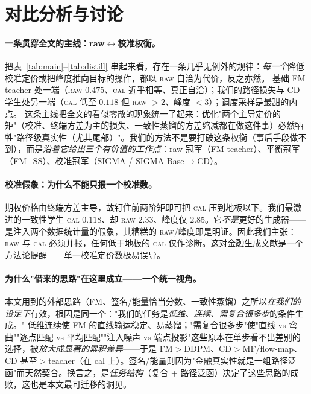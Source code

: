 \documentclass[11pt]{ctexart}
\newcommand{\raw}{\textsc{raw}}
\renewcommand{\cal}{\textsc{cal}}
\begin{document}
\section{对比分析与讨论}
\label{sec:discussion}

\paragraph{一条贯穿全文的主线：raw$\leftrightarrow$校准权衡。}
把表~\ref{tab:main}–\ref{tab:distill} 串起来看，存在一条几乎无例外的规律：\emph{每一个}降低校准定价或把峰度推向目标的操作，都以 \raw{} 自洽为代价，反之亦然。
基础 FM teacher 处一端（\raw{} $0.475$、\cal{} 近乎相等、真正自洽）；我们的路径损失与 CD 学生处另一端（\cal{} 低至 $0.118$ 但 \raw{} $>2$、峰度 $<3$）；调度采样是最甜的内点。
这条主线把全文的看似零散的现象统一了起来：优化"两个主导定价的矩"（校准、终端方差为主的损失、一致性蒸馏的方差缩减都在做这件事）必然牺牲"路径级真实性（尤其尾部）"。我们的方法不是要打破这条权衡（事后手段做不到），而是\emph{沿着它给出三个有价值的工作点}：raw 冠军（FM teacher）、平衡冠军（FM+SS）、校准冠军（SIGMA / SIGMA-Base$\to$CD）。

\paragraph{校准假象：为什么不能只报一个校准数。}
期权价格由终端方差主导，故钉住前两阶矩即可把 \cal{} 压到地板以下。我们最激进的一致性学生 \cal{} $0.118$、却 \raw{} $2.33$、峰度仅 $2.85$。它\emph{不是}更好的生成器——是注入两个数据统计量的假象，其糟糕的 \raw{}/峰度即是明证。因此我们主张：\raw{} 与 \cal{} 必须并报，任何低于地板的 \cal{} 仅作诊断。这对金融生成文献是一个方法论提醒——单一校准定价数极易误导。

\paragraph{为什么"借来的思路"在这里成立——一个统一视角。}
本文用到的外部思路（FM、签名/能量恰当分数、一致性蒸馏）之所以\emph{在我们的设定下}有效，根因是同一个："我们的任务是\emph{低维、连续、需复合很多步}的条件生成。" 低维连续使 FM 的直线输运稳定、易蒸馏；"需复合很多步"使"直线 vs 弯曲""逐点匹配 vs 平均匹配""注入噪声 vs 端点投影"这些原本在单步看不出差别的选择，被\emph{放大成显著的累积差异}——于是 FM$>$DDPM、CD$>$MF/flow-map、CD 甚至$>$teacher（在 cal 上）。签名/能量则因为"金融真实性就是一组路径泛函"而天然契合。换言之，是\emph{任务结构}（复合 + 路径泛函）决定了这些思路的成败，这也是本文最可迁移的洞见。
\end{document}
